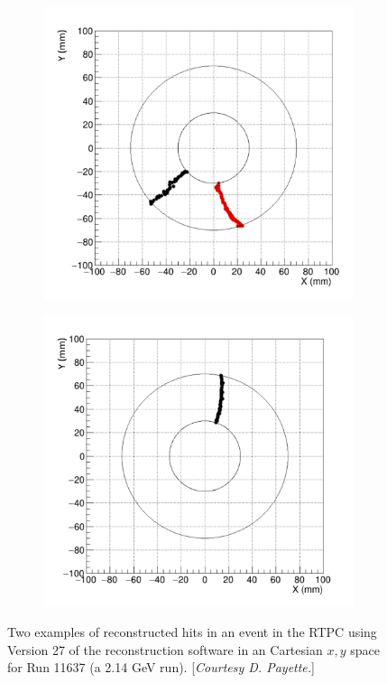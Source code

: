 \begin{figure}[h!]
	\centering
	\begin{subfigure}[b]{0.44\linewidth}
		\includegraphics[width=\linewidth]{figures/RTPC_tracks_11637_1.png}
	\end{subfigure}
	\begin{subfigure}[b]{0.44\textwidth}
		\includegraphics[width=\linewidth]{figures/RTPC_tracks_11637_2.png}
	\end{subfigure}
	\caption{Two examples of reconstructed hits in an event in the RTPC using Version 27 of the reconstruction software in an Cartesian $x,y$ space for Run 11637 (a 2.14 GeV run). [\textit{Courtesy D. Payette.}]}
	\label{fig:rtpc_tracks_11637}
\end{figure}
